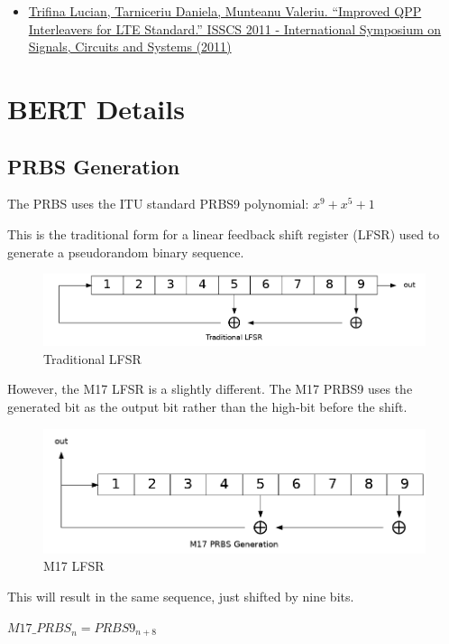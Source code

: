\documentclass[a4paper,11pt,oneside]{book}
\begin{document}
\begin{itemize}
	\item
	\href{https://arxiv.org/abs/1103.3794}{Trifina Lucian, Tarniceriu 	Daniela, Munteanu Valeriu. ``Improved QPP Interleavers for LTE 	Standard.'' ISSCS 2011 - International Symposium on Signals, Circuits 	and Systems (2011)}
\end{itemize}

\chapter{BERT Details} \label{bert_details}

\section{PRBS Generation}

The PRBS uses the ITU standard PRBS9 polynomial: $x^{9}+x^{5}+1$

This is the traditional form for a linear feedback shift register (LFSR)
used to generate a pseudorandom binary sequence.

\begin{figure}[H]
	\centering
	\includegraphics[width=0.7\linewidth]{img/m17-traditional-lfsr}
	\caption{Traditional LFSR}
	\label{fig:m17-traditional-lfsr}
\end{figure}

However, the M17 LFSR is a slightly different. The M17 PRBS9 uses the generated bit as the output bit rather than the high-bit before the shift.

\begin{figure}[H]
	\centering
	\includegraphics[width=0.7\linewidth]{img/m17-prbs9}
	\caption{M17 LFSR}
	\label{fig:m17-prbs9}
\end{figure}

This will result in the same sequence, just shifted by nine bits.

${M17\_PRBS}_{n} = {PRBS9}_{n + 8}$
\end{document}
